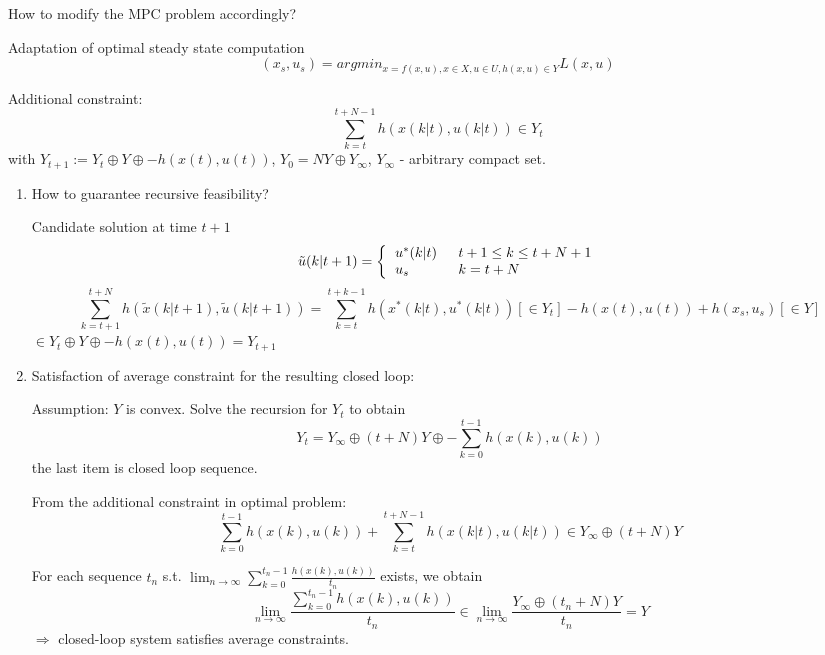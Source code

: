 How to modify the MPC problem accordingly?

Adaptation of optimal steady state computation
\begin{equation*}
(x_s,u_s) = argmin_{x = f(x,u), x \in X, u \in U, h(x,u) \in Y} L(x,u)
\end{equation*}

Additional constraint:
\begin{equation*}
\sum_{k=t}^{t+N-1}h(x(k|t),u(k|t)) \in Y_t
\end{equation*}
with $Y_{t+1} := Y_t \oplus Y \oplus {-h(x(t),u(t))}$, $Y_0 = NY \oplus Y_{\infty}$, $Y_{\infty}$ - arbitrary compact set.

\begin{enumerate}
\item How to guarantee recursive feasibility?

Candidate solution at time $t+1$ 
\begin{equation*}
\tilde{u}(k|t+1) = \left \{
  \begin{tabular}{ll}
  $u^*(k|t)$ & $\ t+1 \leq k \leq t+N+1$ \\
  $u_s$ & $\ k = t + N$
  \end{tabular}
\right .
\end{equation*}
\begin{equation*}
\sum_{k=t+1}^{t+N}h(\tilde{x}(k|t+1), \tilde{u}(k|t+1)) = \sum_{k=t}^{t+k-1}h(x^*(k|t), u^*(k|t))[\in Y_t] - h(x(t),u(t)) + h(x_s,u_s)[\in Y]
\end{equation*}
$\in Y_t \oplus Y \oplus {-h(x(t),u(t))} = Y_{t+1}$
\item Satisfaction of average constraint for the resulting closed loop:

Assumption: $Y$ is convex. Solve the recursion for $Y_t$ to obtain 
\begin{equation*}
Y_t = Y_{\infty} \oplus (t+N)Y \oplus {- \sum_{k=0}^{t-1}h(x(k),u(k))}
\end{equation*}
the last item is closed loop sequence.

From the additional constraint in optimal problem:
\begin{equation*}
\sum_{k=0}^{t-1}h(x(k),u(k)) + \sum_{k=t}^{t+N-1}h(x(k|t), u(k|t)) \in Y_{\infty} \oplus (t+N)Y
\end{equation*}

For each sequence {$t_n$} s.t. $\lim_{n \to \infty} \sum_{k=0}^{t_n -1}\frac{h(x(k),u(k))}{t_n} $ exists, we obtain 
\begin{equation*}
\lim_{n \to \infty} \frac{\sum_{k=0}^{t_n-1}h(x(k),u(k))}{t_n} \in \lim_{n \to \infty} \frac{Y_{\infty} \oplus (t_n + N)Y}{t_n} = Y
\end{equation*}
$\Rightarrow$ closed-loop system satisfies average constraints.
\end{enumerate}

